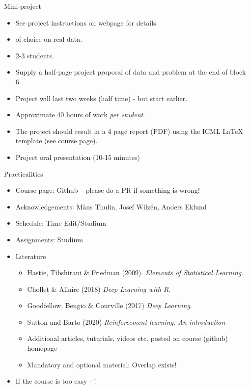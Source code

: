 \documentclass[10pt,handout]{beamer}
\begin{document}
\begin{frame}{Mini-project}

\begin{itemize}
\item See project instructions on webpage for details.\pause
\item {} of choice on real data.
\item 2-3 students.\pause
\item Supply a half-page project proposal of data and problem at the end of block 6.\pause
\item Project will last two weeks (half time) - but start earlier.
\item Approximate 40 hours of work \emph{per student}.\pause
\item The project should result in a 4 page report (PDF) using the ICML LaTeX template (see course page).
\item Project oral presentation (10-15 minutes)\pause
\end{itemize}
\end{frame}


\begin{frame}{Practicalities}

\begin{itemize}
\item Course page: Github -- please do a PR if something is wrong!\pause
\item Acknowledgements: M{\aa}ns Thulin, Josef Wilzén, Anders Eklund\pause
\item Schedule: Time Edit/Studium
\item Assignments: Studium\pause
\item Literature
\begin{itemize}
\item Hastie, Tibshirani \& Friedman (2009). \emph{Elements of Statistical Learning}.
\item Chollet \& Allaire (2018) \emph{Deep Learning with R}.
\item Goodfellow, Bengio \& Courville (2017) \emph{Deep Learning}.
\item Sutton and Barto (2020) \emph{Reinforcement learning: An introduction}
\item Additional articles, tuturials, videos etc. posted on course (github) homepage
\item Mandatory and optional material: Overlap exists!
\end{itemize}
\pause
\item If the course is too easy - !
\end{itemize}

\end{frame}
\end{document}

